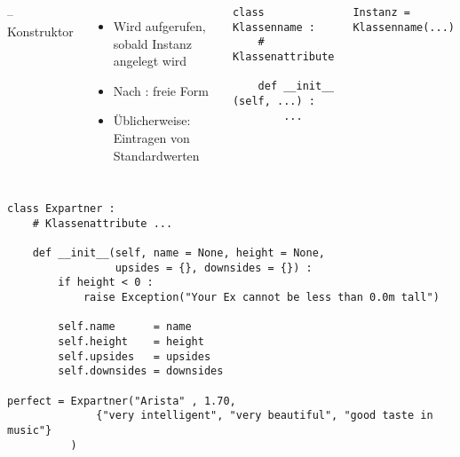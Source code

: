 
\begin{frame}[fragile]
%
\begin{columns}[T]
\begin{Large}
	{ -- Konstruktor}
\end{Large}
\vspace{6pt}
%
\begin{itemize}
\item Wird aufgerufen, sobald Instanz angelegt wird
\item Nach : freie Form
\item Üblicherweise: Eintragen von Standardwerten
\end{itemize}
%
\begin{codebox}
\begin{verbatim}
class Klassenname :
    # Klassenattribute
    
    def __init__ (self, ...) :
        ...
\end{verbatim}
\end{codebox}
%
\begin{codebox}
\begin{verbatim}
Instanz = Klassenname(...)
\end{verbatim}
\end{codebox}
\end{columns}
%
\end{frame}


\begin{frame}[fragile]
%
\begin{codebox}
\begin{verbatim}
class Expartner :
    # Klassenattribute ...
    
    def __init__(self, name = None, height = None,
                 upsides = {}, downsides = {}) :
        if height < 0 :
            raise Exception("Your Ex cannot be less than 0.0m tall")
        
        self.name      = name
        self.height    = height
        self.upsides   = upsides
        self.downsides = downsides
    
perfect = Expartner("Arista" , 1.70, 
              {"very intelligent", "very beautiful", "good taste in music"}
          )
\end{verbatim}
\end{codebox}
%
\end{frame}

